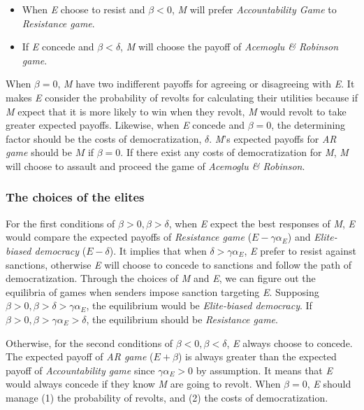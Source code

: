 \documentclass[11pt]{article}
\begin{document}
\begin{itemize}
	\item When \textit{E} choose to resist and $\beta < 0$, \textit{M} will prefer \textit{Accountability Game} to \textit{Resistance game}.
	\item If \textit{E} concede and $\beta < \delta$, \textit{M} will choose the payoff of \textit{Acemoglu \& Robinson game}.
\end{itemize}
	
When $\beta = 0$, \textit{M} have two indifferent payoffs for agreeing or disagreeing with \textit{E}. It makes \textit{E} consider the probability of revolts for calculating their utilities because if \textit{M} expect that it is more likely to win when they revolt, \textit{M} would revolt to take greater expected payoffs.    Likewise, when \textit{E} concede and $\beta = 0$, the determining factor should be the costs of democratization, $\delta$. \textit{M}'s expected payoffs for \textit{AR game} should be $M$ if $\beta = 0$. If there exist any costs of democratization for \textit{M}, \textit{M} will choose to assault and proceed the game of \textit{Acemoglu \& Robinson}. 
	
\subsubsection*{The choices of the elites}
	
For the first conditions of $\beta > 0, \beta > \delta$, when \textit{E} expect the best responses of \textit{M}, \textit{E} would compare the expected payoffs of \textit{Resistance game} ($E-\gamma\alpha_{E}$) and \textit{Elite-biased democracy} ($E-\delta$). It implies that when $\delta > \gamma\alpha_{E}$, \textit{E} prefer to resist against sanctions, otherwise \textit{E} will choose to concede to sanctions and follow the path of democratization. Through the choices of \textit{M} and \textit{E}, we can figure out the equilibria of games when senders impose sanction targeting \textit{E}. Supposing $\beta > 0, \beta > \delta > \gamma\alpha_{E}$, the equilibrium would be \textit{Elite-biased democracy}. If $\beta > 0, \beta > \gamma\alpha_{E} > \delta$, the equilibrium should be \textit{Resistance game}.
	
Otherwise, for the second conditions of $\beta <0, \beta < \delta$, \textit{E} always choose to concede. The expected payoff of \textit{AR game} ($E + \beta$) is always greater than the expected payoff of \textit{Accountability game} since $\gamma\alpha_{E} > 0$ by assumption. It means that \textit{E} would always concede if they know \textit{M} are going to revolt. When $\beta = 0$, \textit{E} should manage (1) the probability of revolts, and (2) the costs of democratization.
	
\end{document}

